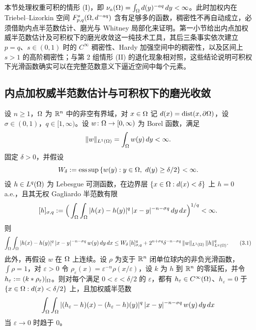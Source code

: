 
本节处理权重可积的情形 (I)，即 $\nu_{a}(\Omega)=\int_\Omega d(y)^{-aq}\,dy<\infty$。此时加权内在 Triebel--Lizorkin 空间 $F^{s}_{p,q}(\Omega,d^{-aq})$ 含有足够多的函数，稠密性不再自动成立，必须借助内点半范数估计、磨光与 Whitney 局部化来证明。第一小节给出内点加权威半范数估计及可积权下的磨光收敛这一纯技术工具，其后三条事实依次建立 $p=q$、$s\in(0,1)$ 时的 $C^\infty$ 稠密性、Hardy 加强空间中的稠密性，以及区间上 $s>1$ 的高阶稠密性；与第 2 组情形 (II) 的退化现象相对照，这些结论说明可积权下光滑函数确实可以在完整范数意义下逼近空间中每个元素。

\subsection{内点加权威半范数估计与可积权下的磨光收敛}

\begin{lemma}[可积情形下的内点加权威半范数估计与磨光收敛]
设 $n\ge 1$，$\Omega$ 为 $\mathbb{R}^n$ 中的非空有界域，对 $x\in\Omega$ 记 $d(x)=\operatorname{dist}(x,\partial\Omega)$，设 $\sigma\in(0,1)$，$q\in[1,\infty)$。设 $w\colon\Omega\to[0,\infty)$ 为 Borel 函数，满足
\[
  \|w\|_{L^1(\Omega)}=\int_\Omega w(y)\,dy<\infty .
\]
固定 $\delta>0$，并假设
\[
  W_\delta:=\esssup\,\{w(y) : y\in\Om,\ d(y)\ge\delta/2\}<\infty .
\]
设 $h\in L^q(\Omega)$ 为 Lebesgue 可测函数，在边界层 $\{x\in\Omega : d(x)<\delta\}$ 上 $h=0$ a.e.，且其无权 Gagliardo 半范数有限
\[
  [h]_{\sigma,q}:=\Big(\int_\Omega\int_\Omega |h(x)-h(y)|^q\,|x-y|^{-n-\sigma q}\,dy\,dx\Big)^{1/q}<\infty .
\]
则
\begin{equation}
  \int_\Omega\int_\Omega |h(x)-h(y)|^q\,|x-y|^{-n-\sigma q}\,w(y)\,dy\,dx
  \le W_\delta\,[h]^q_{\sigma,q}
  +2^{n+\sigma q}\delta^{-n-\sigma q}\,\|w\|_{L^1(\Omega)}\,\|h\|^q_{L^q(\Omega)} .
  \tag{3.1}
\end{equation}
此外，再假设 $w$ 在 $\Omega$ 上连续。设 $\rho$ 为支于 $\mathbb{R}^n$ 闭单位球内的非负光滑函数，$\int\rho=1$，对 $\varepsilon>0$ 令 $\rho_\varepsilon(x)=\varepsilon^{-n}\rho(x/\varepsilon)$，设 $k$ 为 $h$ 到 $\mathbb{R}^n$ 的零延拓，并令 $h_\varepsilon:=(k*\rho_\varepsilon)|_\Omega$。则对每个满足 $0<\varepsilon<\delta/2$ 的 $\varepsilon$，都有 $h_\varepsilon\in C^\infty(\Omega)$、$h_\varepsilon=0$ 于 $\{x\in\Omega : d(x)<\delta/2\}$ 上，且加权威半范数
\[
  \int_\Omega\int_\Omega |(h_\varepsilon-h)(x)-(h_\varepsilon-h)(y)|^q\,|x-y|^{-n-\sigma q}\,w(y)\,dy\,dx
\]
当 $\varepsilon\to 0$ 时趋于 $0$。
\end{lemma}

